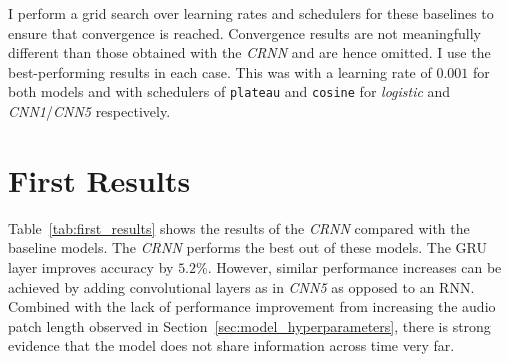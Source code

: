 I perform a grid search over learning rates and schedulers for these baselines to ensure that convergence is reached. Convergence results are not meaningfully different than those obtained with the \emph{CRNN} and are hence omitted. I use the best-performing results in each case. This was with a learning rate of $0.001$ for both models and with schedulers of \texttt{plateau} and \texttt{cosine} for \emph{logistic} and \emph{CNN1}/\emph{CNN5} respectively.



\section{First Results}

Table~\ref{tab:first_results} shows the results of the \emph{CRNN} compared with the baseline models. The \emph{CRNN} performs the best out of these models. The GRU layer improves accuracy by $5.2\%$. However, similar performance increases can be achieved by adding convolutional layers as in \emph{CNN5} as opposed to an RNN. Combined with the lack of performance improvement from increasing the audio patch length observed in Section~\ref{sec:model_hyperparameters}, there is strong evidence that the model does not share information across time very far.

